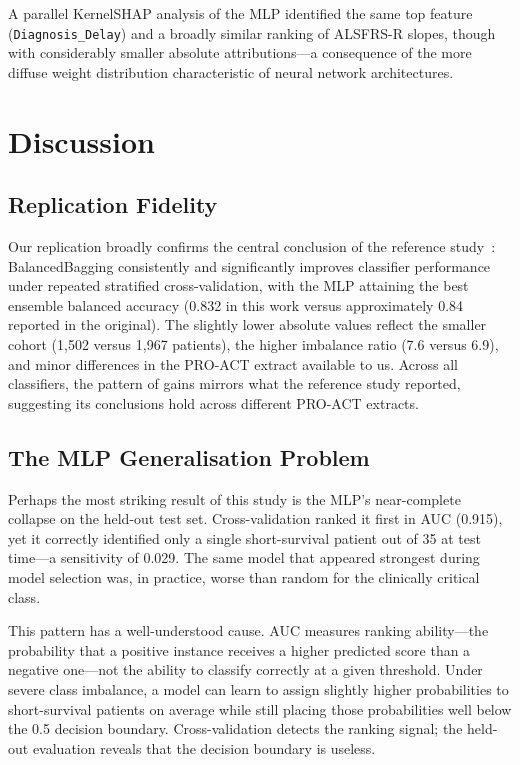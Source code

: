 \documentclass[a4paper,twoside]{article}
\begin{document}
A parallel KernelSHAP analysis of the MLP identified the same top feature
(\texttt{Diagnosis\_Delay}) and a broadly similar ranking of ALSFRS-R slopes,
though with considerably smaller absolute attributions---a consequence of the
more diffuse weight distribution characteristic of neural network architectures.


\section{Discussion}
\label{sec:discussion}

\subsection{Replication Fidelity}

Our replication broadly confirms the central conclusion of the reference
study~\cite{Papaiz2024}: BalancedBagging consistently and significantly improves
classifier performance under repeated stratified cross-validation, with the MLP
attaining the best ensemble balanced accuracy (0.832 in this work versus
approximately 0.84 reported in the original). The slightly lower absolute values reflect the smaller cohort (1,502 versus
1,967 patients), the higher imbalance ratio (7.6 versus 6.9), and minor
differences in the PRO-ACT extract available to us. Across all classifiers,
the pattern of gains mirrors what the reference study reported, suggesting its
conclusions hold across different PRO-ACT extracts.

\subsection{The MLP Generalisation Problem}

Perhaps the most striking result of this study is the MLP's near-complete
collapse on the held-out test set. Cross-validation ranked it first in AUC
(0.915), yet it correctly identified only a single short-survival patient
out of 35 at test time---a sensitivity of 0.029. The same model that appeared
strongest during model selection was, in practice, worse than random for the
clinically critical class.

This pattern has a well-understood cause. AUC measures ranking ability---the
probability that a positive instance receives a higher predicted score than a
negative one---not the ability to classify correctly at a given threshold. Under
severe class imbalance, a model can learn to assign slightly higher probabilities
to short-survival patients on average while still placing those probabilities well
below the 0.5 decision boundary. Cross-validation detects the ranking signal;
the held-out evaluation reveals that the decision boundary is useless.
\end{document}
